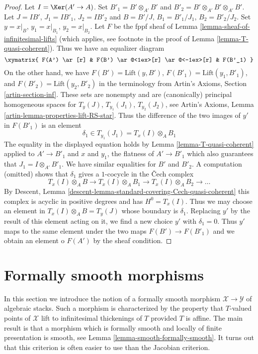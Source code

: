 \begin{proof}
Let $I = \Ker(A' \to A)$. Set $B'_1 = B' \otimes_{A'} B'$ and
$B'_2 = B' \otimes_{A'} B' \otimes_{A'} B'$. Let
$J = IB'$, $J_1 = IB'_1$, $J_2 = IB'_2$ and
$B = B'/J$, $B_1 = B'_1/J_1$, $B_2 = B'_2/J_2$.
Set $y = x|_B$, $y_1 = x|_{B_1}$, $y_2 = x|_{B_2}$.
Let $F$ be the fppf sheaf of
Lemma \ref{lemma-sheaf-of-infinitesimal-lifts}
(which applies, see footnote in the proof of
Lemma \ref{lemma-T-quasi-coherent}).
Thus we have an equalizer diagram
$$
\xymatrix{
F(A') \ar[r] &
F(B') \ar@<1ex>[r] \ar@<-1ex>[r] &
F(B'_1)
}
$$
On the other hand, we have $F(B') = \text{Lift}(y, B')$,
$F(B'_1) = \text{Lift}(y_1, B'_1)$, and $F(B'_2) = \text{Lift}(y_2, B'_2)$
in the terminology from Artin's Axioms, Section \ref{artin-section-inf}.
These sets are nonempty and are (canonically) principal homogeneous spaces for
$T_y(J)$, $T_{y_1}(J_1)$, $T_{y_2}(J_2)$, see
Artin's Axioms, Lemma \ref{artin-lemma-properties-lift-RS-star}.
Thus the difference of the two images of $y'$ in
$F(B'_1)$ is an element
$$
\delta_1 \in T_{y_1}(J_1) = T_x(I) \otimes_A B_1
$$
The equality in the displayed equation holds by
Lemma \ref{lemma-T-quasi-coherent} applied to
$A' \to B'_1$ and $x$ and $y_1$, the flatness of $A' \to B'_1$
which also guarantees that $J_1 = I \otimes_{A'} B'_1$. We have
similar equalities for $B'$ and $B'_2$.
A computation (omitted) shows that $\delta_1$ gives
a $1$-cocycle in the {\v C}ech complex
$$
T_x(I) \otimes_A B \to
T_x(I) \otimes_A B_1 \to
T_x(I) \otimes_A B_2 \to \ldots
$$
By Descent, Lemma \ref{descent-lemma-standard-covering-Cech-quasi-coherent}
this complex is acyclic in positive degrees and has $H^0 = T_x(I)$.
Thus we may choose an element in $T_x(I) \otimes_A B = T_y(J)$
whose boundary is $\delta_1$. Replacing $y'$ by the result
of this element acting on it, we find a new choice $y'$ with $\delta_1 = 0$.
Thus $y'$ maps to the same element under the two maps
$F(B') \to F(B'_1)$ and we obtain an element o $F(A')$ by
the sheaf condition.
\end{proof}












\section{Formally smooth morphisms}
\label{section-formally-smooth}

\noindent
In this section we introduce the notion of a formally smooth morphism
$\mathcal{X} \to \mathcal{Y}$ of algebraic stacks. Such a morphism is
characterized by the property that $T$-valued points of $\mathcal{X}$ lift
to infinitesimal thickenings of $T$ provided $T$ is affine.
The main result is that a morphism which is formally smooth and
locally of finite presentation is smooth, see
Lemma \ref{lemma-smooth-formally-smooth}.
It turns out that this criterion is often easier to use than the
Jacobian criterion.

